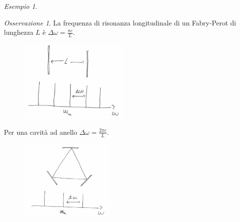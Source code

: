 \documentclass{book}
\def \D {\Delta}
\theoremstyle{remark}
\newtheorem*{os}{Osservazione}
\newtheorem{example}{Esempio}[section]
\begin{document}
\begin{example}
\begin{os}
La frequenza di risonanza longitudinale di un
Fabry-Perot di lunghezza $L$ è $\D\omega = \frac{\pi c}{L}$.
\end{os}
\begin{figure}[H]
\centering
\includegraphics[height=4cm]{images/14}
\end{figure}
\noindent
Per una cavità ad anello $\D\omega = \frac{2\pi c}{L}$.
\begin{figure}[H]
\centering
\includegraphics[height=4cm]{images/15}
\end{figure}
\end{example}
\end{document}
